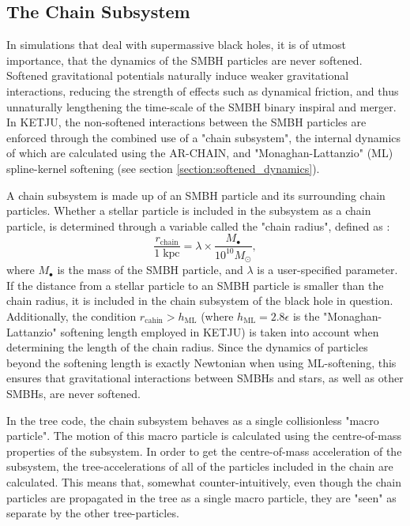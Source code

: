 \documentclass[english, twoside]{HYgradu}
\begin{document}
\subsection{The Chain Subsystem}

In simulations that deal with supermassive black holes, it is of utmost importance, that the dynamics of the SMBH particles are never softened. Softened gravitational potentials naturally induce weaker gravitational interactions, reducing the strength of effects such as dynamical friction, and thus unnaturally lengthening the time-scale of the SMBH binary inspiral and merger. In KETJU, the non-softened interactions between the SMBH particles are enforced through the combined use of a "chain subsystem", the internal dynamics of which are calculated using the AR-CHAIN, and "Monaghan-Lattanzio" (ML) spline-kernel softening (see section \ref{section:softened_dynamics}). 

A chain subsystem is made up of an SMBH particle and its surrounding chain particles. Whether a stellar particle is included in the subsystem as a chain particle, is determined through a variable called the "chain radius", defined as \citep{Rantala2017KETJU}:
\begin{equation}
\frac{r_\mathrm{chain}}{1 \; \mathrm{kpc}} = \lambda \times \frac{M_\bullet}{10^{10} M_\odot},
\end{equation}
where $M_\bullet$ is the mass of the SMBH particle, and $\lambda$ is a user-specified parameter. If the distance from a stellar particle to an SMBH particle is smaller than the chain radius, it is included in the chain subsystem of the black hole in question. Additionally, the condition $r_\mathrm{cahin} > h_\mathrm{ML}$ (where $h_\mathrm{ML} = 2.8\epsilon$ is the "Monaghan-Lattanzio" softening length employed in KETJU) is taken into account when determining the length of the chain radius. Since the dynamics of particles beyond the softening length is exactly Newtonian when using ML-softening, this ensures that gravitational interactions between SMBHs and stars, as well as other SMBHs, are never softened.

In the tree code, the chain subsystem behaves as a single collisionless "macro particle". The motion of this macro particle is calculated using the centre-of-mass properties of the subsystem. In order to get the centre-of-mass acceleration of the subsystem, the tree-accelerations of all of the particles included in the chain are calculated. This means that, somewhat counter-intuitively, even though the chain particles are propagated in the tree as a single macro particle, they are "seen" as separate by the other tree-particles.
\end{document}
